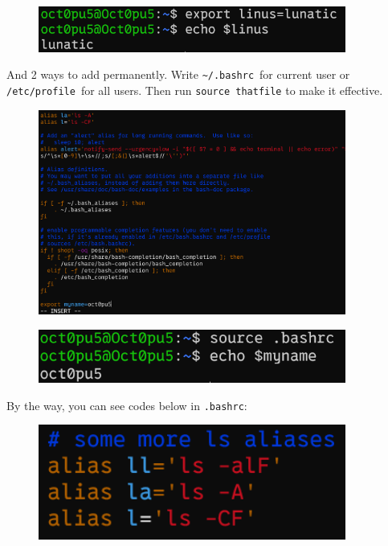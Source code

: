 \documentclass[12pt]{ctexart}
\begin{document}
\begin{figure}[H]
    \centering
    \includegraphics[width=0.9\textwidth,keepaspectratio]{assets/Linux/1.11 Linux environment variables/3.png}
\end{figure}

And 2 ways to add permanently. Write \texttt{\textasciitilde{}/.bashrc}\
for current user or \texttt{/etc/profile}\ for all users. Then run
\texttt{source\ thatfile} to make it effective.

\begin{figure}[H]
    \centering
    \includegraphics[width=0.9\textwidth,keepaspectratio]{assets/Linux/1.11 Linux environment variables/4.png}
\end{figure}

\begin{figure}[H]
    \centering
    \includegraphics[width=0.9\textwidth,keepaspectratio]{assets/Linux/1.11 Linux environment variables/5.png}
\end{figure}

By the way, you can see codes below in \texttt{.bashrc}:

\begin{figure}[H]
    \centering
    \includegraphics[width=0.9\textwidth,keepaspectratio]{assets/Linux/1.11 Linux environment variables/6.png}
\end{figure}
\end{document}
